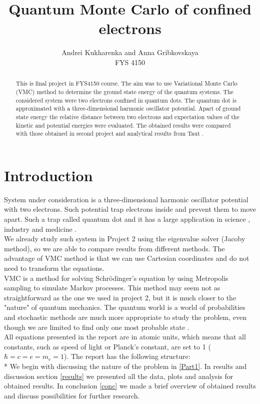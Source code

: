 \documentclass[10pt]{article}
\begin{document}
\setlength\parindent{1pt}
\title{Quantum Monte Carlo of confined electrons }
\author{Andrei Kukharenka and Anna Gribkovskaya \\  
FYS 4150 
}

\maketitle
\begin{abstract}
This is final project in FYS4150 course. The aim was to use Variational Monte Carlo (VMC) method to determine the ground state energy of the quantum systems. The considered system were two electrons confined in quantum dots. The quantum dot is approximated with a three-dimensional harmonic oscillator potential. Apart of ground state energy the relative distance between two electrons and expectation values of the kinetic and potential energies were evaluated. The obtained results were compared with those obtained in second project and analytical results from Taut \cite{three}. 
\end{abstract}
\clearpage 


\section{Introduction}
System under consideration is a three-dimensional harmonic oscillator potential with two electrons. Such potential trap electrons inside and prevent them to move apart. Such a trap called quantum dot and it has a large application in science \cite{four}, industry\cite{five} and medicine \cite{med}. \\
We already study such system in Project 2 using the eigenvalue solver (Jacoby method), so we are able to compare results from different methods. The advantage of VMC method is that we can use Cartesian coordinates and do not need to transform the equations. \\ 
VMC is a method for solving Schr\"{o}dinger's equation by using Metropolis sampling to simulate Markov processes. This method may seem not as straightforward as the one we used in project 2, but it is much closer to the "nature" of quantum mechanics. The quantum world is a world of probabilities and stochastic methods are much more appropriate to study the problem, even though we are limited to find only one most probable state \cite{one}. \\
All equations presented in the report are in atomic units, which means that all constants, such as speed of light or Planck's constant, are set to 1 ($\hbar=c=e=m_e=1$).
The report has the following structure:\\*
We begin with discussing the nature of the problem in \ref{Part1}.
In results and discussion section \ref{results} we presented all the data, plots and analysis for obtained results. 
In conclusion \ref{conc} we made a brief overview of obtained results and discuss possibilities for further research. 
\end{document}
